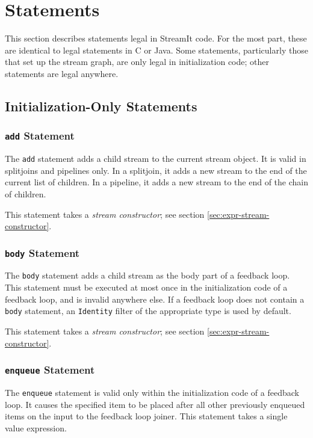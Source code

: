 \documentclass[11pt]{article}
\begin{document}
\section{Statements}

This section describes statements legal in StreamIt code.  For the
most part, these are identical to legal statements in C or Java.  Some
statements, particularly those that set up the stream graph, are only
legal in initialization code; other statements are legal anywhere.

\subsection{Initialization-Only Statements}

\subsubsection{\lstinline|add| Statement}

The \lstinline|add| statement adds a child stream to the current stream
object.  It is valid in splitjoins and pipelines only.  In a
splitjoin, it adds a new stream to the end of the current list of
children.  In a pipeline, it adds a new stream to the end of the chain
of children.

This statement takes a \emph{stream constructor}; see section
\ref{sec:expr-stream-constructor}.

\subsubsection{\lstinline|body| Statement}

The \lstinline|body| statement adds a child stream as the body part of
a feedback loop.  This statement must be executed at most once in the
initialization code of a feedback loop, and is invalid anywhere else.
If a feedback loop does not contain a \lstinline|body| statement, an
\lstinline|Identity| filter of the appropriate type is used by
default.

This statement takes a \emph{stream constructor}; see section
\ref{sec:expr-stream-constructor}.

\subsubsection{\lstinline|enqueue| Statement}

The \lstinline|enqueue| statement is valid only within the
initialization code of a feedback loop.  It causes the specified item
to be placed after all other previously enqueued items on the input to
the feedback loop joiner.  This statement takes a single value
expression.
\end{document}
